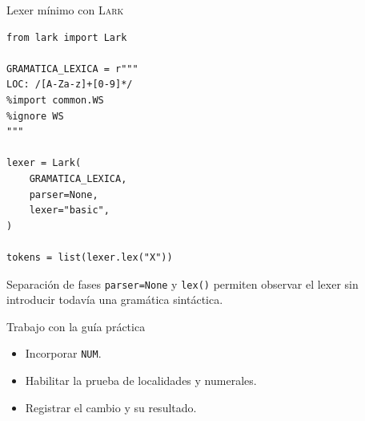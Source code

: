 \documentclass[11pt,spanish]{beamer}
\newcommand{\actividad}[1]{\textbf{\textcolor{Rojo}{#1}}}
\begin{document}
\begin{frame}[fragile]{Lexer mínimo con \textsc{Lark}}
\vfill

\begin{lstlisting}
from lark import Lark

GRAMATICA_LEXICA = r"""
LOC: /[A-Za-z]+[0-9]*/
%import common.WS
%ignore WS
"""

lexer = Lark(
    GRAMATICA_LEXICA,
    parser=None,
    lexer="basic",
)

tokens = list(lexer.lex("X"))
\end{lstlisting}

\begin{block}{Separación de fases}
\texttt{parser=None} y \texttt{lex()} permiten observar el lexer sin introducir todavía una gramática sintáctica.
\end{block}

\vfill
\end{frame}

\begin{frame}{Trabajo con la guía práctica}
\vfill
\begin{center}
\end{center}
\bigskip
\begin{itemize}
  \item Incorporar \texttt{NUM}.
  \item Habilitar la prueba de localidades y numerales.
  \item Registrar el cambio y su resultado.
\end{itemize}
\vfill
\end{frame}
\end{document}
